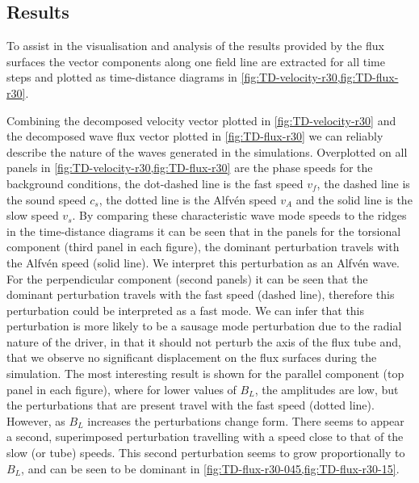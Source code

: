 \subsection{Results}\label{subsec:expfac-results}

To assist in the visualisation and analysis of the results provided by the flux surfaces the vector components along one field line are extracted for all time steps and plotted as time-distance diagrams in \cref{fig:TD-velocity-r30,fig:TD-flux-r30}.

Combining the decomposed velocity vector plotted in \cref{fig:TD-velocity-r30} and the decomposed wave flux vector plotted in \cref{fig:TD-flux-r30} we can reliably describe the nature of the waves generated in the simulations.
Overplotted on all panels in \cref{fig:TD-velocity-r30,fig:TD-flux-r30} are the phase speeds for the background conditions, the dot-dashed line is the fast speed $v_f$, the dashed line is the sound speed $c_s$, the dotted line is the Alfv\'en speed $v_A$ and the solid line is the slow speed $v_s$.
By comparing these characteristic wave mode speeds to the ridges in the time-distance diagrams it can be seen that in the panels for the torsional component (third panel in each figure), the dominant perturbation travels with the Alfv\'en speed (solid line).
We interpret this perturbation as an Alfv\'en wave.
For the perpendicular component (second panels) it can be seen that the dominant perturbation travels with the fast speed (dashed line), therefore this perturbation could be interpreted as a fast mode.
We can infer that this perturbation is more likely to be a sausage mode perturbation due to the radial nature of the driver, in that it should not perturb the axis of the flux tube and, that we observe no significant displacement on the flux surfaces during the simulation.
The most interesting result is shown for the parallel component (top panel in each figure), where for lower values of $B_L$, the amplitudes are low, but the perturbations that are present travel with the fast speed (dotted line).
However, as $B_L$ increases the perturbations change form.
There seems to appear a second, superimposed perturbation travelling with a speed close to that of the slow (or tube) speeds.
This second perturbation seems to grow proportionally to $B_L$, and can be seen to be dominant in \cref{fig:TD-flux-r30-045,fig:TD-flux-r30-15}.

